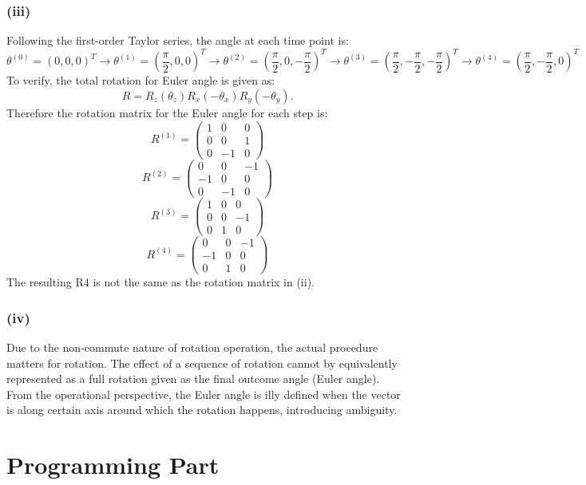 \documentclass[11pt]{article}
\begin{document}
\subsubsection*{(iii)}
Following the first-order Taylor series, the angle at each time point is:
\[
    \theta^{(0)}=(0,0,0)^T\to\theta^{(1)}=(\frac{\pi}{2},0,0)^T\to\theta^{(2)}=(\frac{\pi}{2},0,-\frac{\pi}{2})^T\to\theta^{(3)}=(\frac{\pi}{2},-\frac{\pi}{2},-\frac{\pi}{2})^T\to\theta^{(4)}=(\frac{\pi}{2},-\frac{\pi}{2},0)^T 
\]
To verify, the total rotation for Euler angle is given as:
\begin{equation}
    R = R_z(\theta_z)R_x(-\theta_x)R_y(-\theta_y). 
\end{equation}
Therefore the rotation matrix for the Euler angle for each step is:
\begin{equation}
    R^{(1)} = \begin{pmatrix}1&0&0\\0&0&1\\0&-1&0\end{pmatrix}  
\end{equation}
\begin{equation}
    R^{(2)} = \begin{pmatrix}0&0&-1\\-1&0&0\\0&-1&0\end{pmatrix}  
\end{equation}
\begin{equation}
    R^{(3)} = \begin{pmatrix}1&0&0\\0&0&-1\\0&1&0\end{pmatrix}  
\end{equation}
\begin{equation}
    R^{(4)} = \begin{pmatrix}0&0&-1\\-1&0&0\\0&1&0\end{pmatrix}  
\end{equation}
The resulting R4 is not the same as the rotation matrix in (ii).

\subsubsection*{(iv)}
Due to the non-commute nature of rotation operation, the actual procedure matters for rotation. The effect of a sequence of rotation cannot by equivalently represented as a full rotation given as the final outcome angle (Euler angle). 
From the operational perspective, the Euler angle is illy defined when the vector is along certain axis around which the rotation happens, introducing ambiguity. 

\newpage

\section*{Programming Part}
\subsection*{}
\end{document}
